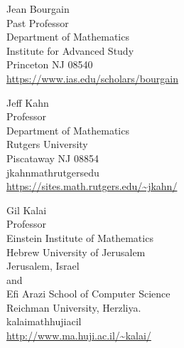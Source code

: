 \documentclass{toc}
\newcommand{\0}[0]{\emptyset}
\begin{document}
%
%
%
%
%
\begin{tocauthors}
\begin{tocinfo}[Bourgain]
Jean Bourgain\\
Past Professor\\
 Department of Mathematics\\
 Institute for Advanced Study\\
Princeton  NJ 08540\\
%
\url{https://www.ias.edu/scholars/bourgain}
\end{tocinfo}
%

\begin{tocinfo}[Kahn]
Jeff Kahn\\
Professor\\
 Department of Mathematics\\
Rutgers University\\
Piscataway NJ 08854\\
 jkahn\tocat{}math\tocdot{}rutgers\tocdot{}edu \\   %
 \url{https://sites.math.rutgers.edu/~jkahn/}
\end{tocinfo}

\begin{tocinfo}[Kalai]
Gil Kalai \\
 Professor\\
Einstein Institute of Mathematics\\
Hebrew University of Jerusalem \\
Jerusalem, Israel\\
and\\
Efi Arazi School of Computer Science\\
Reichman University, Herzliya.\\
%
 kalai\tocat{}math\tocdot{}huji\tocdot{}ac\tocdot{}il \\   %
 \url{http://www.ma.huji.ac.il/~kalai/}   %
\end{tocinfo}

\end{tocauthors}
\end{document}
